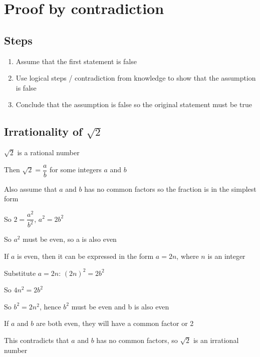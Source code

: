 \section{Proof by contradiction}
\subsection{Steps}
\begin{enumerate}
    \item Assume that the first statement is false
    \item Use logical steps / contradiction from knowledge to show that the assumption is false
    \item Conclude that the assumption is false so the original statement must be true
\end{enumerate}
\subsection{Irrationality of $\sqrt{2}$}
\begin{description}
    \item [Assumption:] $\sqrt{2}$ is a rational number
    \item Then $\sqrt{2} = \dfrac{a}{b}$ for some integers $a$ and $b$
    \item Also assume that $a$ and $b$ has no common factors so the fraction is in the simplest form
    \item So $2=\dfrac{a^2}{b^2}$, $a^2=2b^2$
    \item So $a^2$ must be even, so a is also even
    \item If $a$ is even, then it can be expressed in the form $a=2n$, where $n$ is an integer
    \item Substitute $a=2n$: $(2n)^2=2b^2$
    \item So $4n^2 = 2b^2$
    \item So $b^2=2n^2$, hence $b^2$ must be even and b is also even
    \item If $a$ and $b$ are both even, they will have a common factor or 2
    \item This contradicts that $a$ and $b$ has no common factors, so $\sqrt{2}$ is an irrational number
\end{description}


